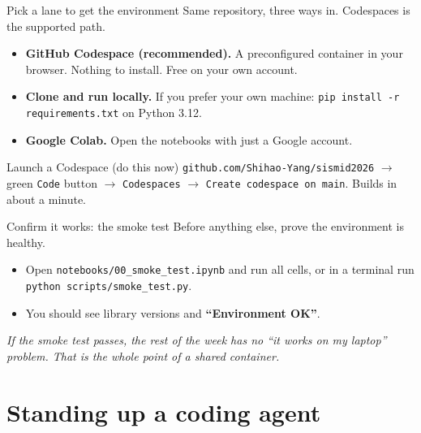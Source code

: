 \documentclass[aspectratio=169,11pt]{beamer}
\begin{document}
\begin{frame}{Pick a lane to get the environment}
  Same repository, three ways in. Codespaces is the supported path.
  \begin{itemize}
    \item \textbf{GitHub Codespace (recommended).} A preconfigured container in your
          browser. Nothing to install. Free on your own account.
    \item \textbf{Clone and run locally.} If you prefer your own machine:
          \texttt{pip install -r requirements.txt} on Python 3.12.
    \item \textbf{Google Colab.} Open the notebooks with just a Google account.
  \end{itemize}
  \vspace{0.4em}
  \begin{exampleblock}{Launch a Codespace (do this now)}
    \texttt{github.com/Shihao-Yang/sismid2026} $\rightarrow$ green \texttt{Code}
    button $\rightarrow$ \texttt{Codespaces} $\rightarrow$
    \texttt{Create codespace on main}. Builds in about a minute.
  \end{exampleblock}
\end{frame}

\begin{frame}{Confirm it works: the smoke test}
  Before anything else, prove the environment is healthy.
  \begin{itemize}
    \item Open \texttt{notebooks/00\_smoke\_test.ipynb} and run all cells, or in a
          terminal run \texttt{python scripts/smoke\_test.py}.
    \item You should see library versions and \textbf{``Environment OK''}.
  \end{itemize}
  \vspace{0.5em}
  \begin{center}
    \itshape If the smoke test passes, the rest of the week has no ``it works on my
    laptop'' problem. That is the whole point of a shared container.
  \end{center}
\end{frame}

\section{Standing up a coding agent}
\end{document}
